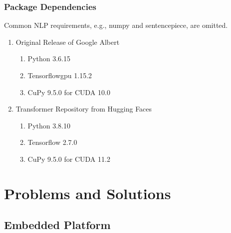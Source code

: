 \documentclass[a4paper]{article}
\begin{document}
\subsubsection{Package Dependencies}
Common NLP requirements, e.g., numpy and sentencepiece, are omitted.
\begin{enumerate}
    \item Original Release of Google Albert
        \begin{enumerate} 
            \item Python 3.6.15
            \item Tensorflowgpu 1.15.2
            \item CuPy 9.5.0 for CUDA 10.0
        \end{enumerate}
    \item Transformer Repository from Hugging Faces
        \begin{enumerate} 
            \item Python 3.8.10
            \item Tensorflow 2.7.0
            \item CuPy 9.5.0 for CUDA 11.2
        \end{enumerate}
\end{enumerate}

\section{Problems and Solutions}
\subsection{Embedded Platform}
\end{document}
